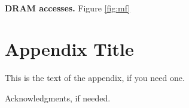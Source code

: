 \documentclass{sigplanconf}
\begin{document}
\begin{figure*}
  \begin{center}
    \mbox{
       \quad
      \quad
    }
\end{center}
\vspace{-10pt}
\begin{center}
\caption{\textbf{Average memory fetch latency of three schedulers, normalized to GTO. For heavy memory intensive benchmarks, iWarp achieves the shortest average memory fetch latency among the three schedulers with different size of L1D cache. \label{fig:mf}}}
\end{center}
\vspace*{-15pt}
\end{figure*}

\noindent \textbf{DRAM accesses.} Figure \ref{fig:mf}

\appendix
\section{Appendix Title}

This is the text of the appendix, if you need one.

\acks

Acknowledgments, if needed.


%
%
%
%
%


\end{document}

